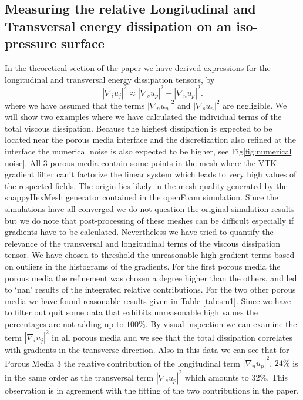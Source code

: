\documentclass[draft,jgrga]{agutexSI2019}
\begin{document}
\begin{article}
\section{Measuring the relative Longitudinal and Transversal energy dissipation on an iso-pressure surface} 
In the theoretical section of the paper we have derived expressions for the longitudinal and transversal energy dissipation tensors, by 
\begin{equation}\label{eq:reduced_dissipation_tensor}
\left|\nabla_i u_j\right|^2 \approx  \left|\nabla_s u_p\right|^2 + \left|\nabla_n u_p\right|^2 .
\end{equation}
where we have assumed that the terms $ \left|\nabla_n u_n\right|^2$ and $ \left|\nabla_s u_n\right|^2$ are negligible. We will show two examples where we have calculated the individual terms of the total viscous dissipation. Because the highest dissipation is expected to be located near the porous media interface and the discretization also refined at the interface the numerical noise is also expected to be higher, see Fig\ref{fig:numerical noise}. All 3 porous media contain some points in the mesh where the VTK gradient filter can't factorize the linear system which leads to very high values of the respected fields. The origin lies likely in the mesh quality generated by the snappyHexMesh generator contained in the openFoam simulation. Since the simulations have all converged we do not question the original simulation results but we do note that post-processing of these meshes can be difficult especially if gradients have to be calculated. Nevertheless we have tried to quantify the relevance of the transversal and longitudinal terms of the viscous dissipation tensor. We have chosen to threshold the unreasonable high gradient terms based on outliers in the histograms of the gradients. For the first porous media the porous media the refinement was chosen a degree higher than the others, and led to `nan' results of the integrated relative contributions. For the two other porous media we have found reasonable results given in Table \ref{tab:sm1}. Since we have to filter out quit some data that exhibits unreasonable high values the percentages are not adding up to $100\%$. By visual inspection we can examine the term $\left|\nabla_i u_j\right|^2$ in all porous media and we see that the total dissipation correlates with gradients in the transverse direction. Also in this data we can see that for Porous Media 3 the relative contribution of the longitudinal term $ \left|\nabla_n u_p\right|^2$, $24\%$ is in the same order as the transversal term $ \left|\nabla_s u_p\right|^2$ which amounts to $32\%$. This observation is in agreement with the fitting of the two contributions in the paper.


\end{article}
\end{document}

